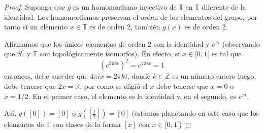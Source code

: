 \documentclass[12pt]{report}
\theoremstyle{largebreak}
\begin{document}
    \begin{proof}
        Suponga que $g$ es un homomorfismo inyectivo de $\mathbb{T}$ en $\mathbb{T}$ diferente de la identidad. Los homomorfismos preservan el orden de los elementos del grupo, por tanto si un elemento $x\in\mathbb{T}$ es de orden 2, también $g(x)$ es de orden 2.

        Afirmamos que los únicos elementos de orden 2 son la identidad y $e^{\pi i}$ (observando que $S^1$ y $\mathbb{T}$ son topológicamente isomorfos). En efecto, si $x\in[0,1[$ es tal que
        \begin{equation*}
            (e^{2\pi ix})^2=e^{4\pi ix}=1
        \end{equation*}
        entonces, debe suceder que $4\pi ix = 2\pi ki$, donde $k\in\mathbb{Z}$ es un número entero luego, debe tenerse que $2x = \mathbb{K}$, por como se eligió el $x$ debe tenerse que $x=0$ o $x=1/2$. En el primer caso, el elemento es la identidad y, en el segundo, es $e^{\pi i}$.

        Así, $g([0])=[0]$ o $g([\frac{1}{2}])=[0]$ (estamos planetando en este caso que los elementos de $\mathbb{T}$ son clases de la forma $[x]$ con $x\in[0,1[$)
    \end{proof}
\end{document}
